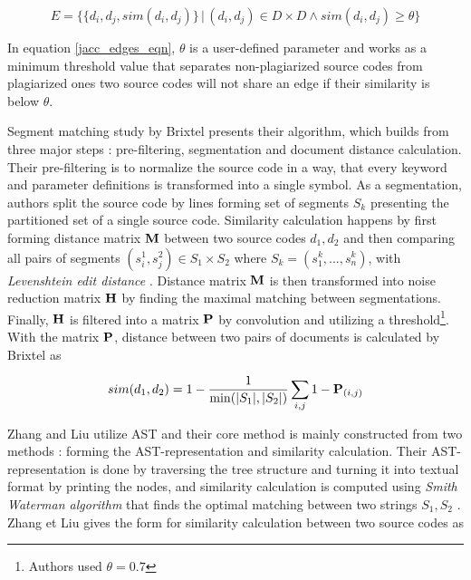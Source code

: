 \begin{equation}\label{jacc_edges_eqn}
         E = \Big\{ \{ d_i, d_j, sim(d_i, d_j)\} \, | \, (d_i, d_j) \in D \times D \land sim(d_i, d_j) \geq \theta \Big\}
\end{equation}

\noindent
In equation \ref{jacc_edges_eqn}, $\theta$ is a user-defined parameter and works as a minimum threshold value that separates non-plagiarized source codes from plagiarized ones \ie two source codes will not share an edge if their similarity is below $\theta$.

Segment matching study by Brixtel \etal presents their algorithm, which builds from three major steps \cite{LICD2010}: pre-filtering, segmentation and document distance calculation. Their pre-filtering is to normalize the source code in a way, that every keyword and parameter definitions is transformed into a single symbol. As a segmentation, authors split the source code by lines forming set of segments $S_k$ presenting the partitioned set of a single source code. Similarity calculation happens by first forming distance matrix $\mathbf{M}$ between two source codes $d_1, d_2$ and then comparing all pairs of segments $(s_i^1, s_j^2) \in S_1 \times S_2$ where $S_k = (s_1^k, ..., s_n^k)$, with \emph{Levenshtein edit distance} \cite{BCCCDIR1966}. Distance matrix $\mathbf{M}$ is then transformed into noise reduction matrix $\mathbf{H}$ by finding the maximal matching between segmentations. Finally, $\mathbf{H}$ is filtered into a matrix $\mathbf{P}$ by convolution and utilizing a threshold\footnote{Authors used $\theta = 0.7$}. With the matrix $\mathbf{P}$, distance between two pairs of documents is calculated by Brixtel \etal as 

\begin{equation}
    sim(d_1, d_2) = 1 - \dfrac{1}{\min(|S_1|, |S_2|)}\sum_{i, j} 1 - \mathbf{P}_{(i, j)}
\end{equation}

\noindent
Zhang and Liu utilize AST and their core method is mainly constructed from two methods \cite{ASTMLPD2013}: forming the AST-representation and similarity calculation. Their AST-representation is done by traversing the tree structure and turning it into textual format by printing the nodes, and similarity calculation is computed using \emph{Smith Waterman algorithm} that finds the optimal matching between two strings $S_1, S_2$ \cite{SMITH1981195}. Zhang et Liu gives the form for similarity calculation between two source codes as


